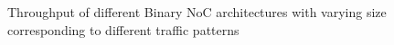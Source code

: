 \begin{figure}[t]
\centering    %
{}
\caption{Throughput of different Binary NoC architectures with varying size corresponding to different traffic patterns}
\label{fig:tput}
\end{figure}

